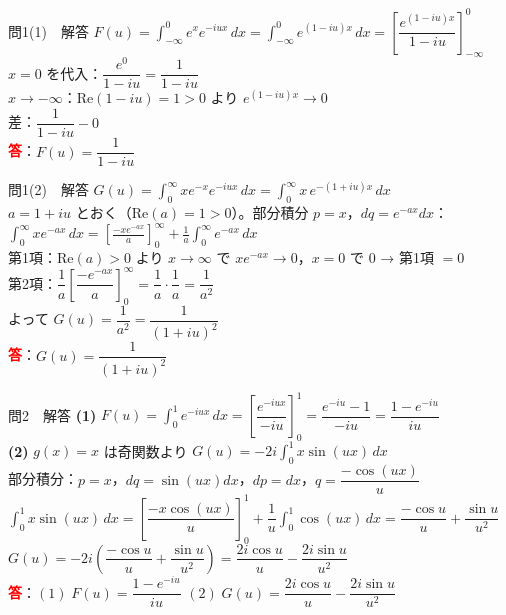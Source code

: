 \documentclass[professionalfonts]{beamer}
\begin{document}
\begin{frame}{問1(1)　解答}
  $F(u) = \displaystyle\int_{-\infty}^{0}e^{x}e^{-iux}\,dx
    = \int_{-\infty}^{0}e^{(1-iu)x}\,dx
    = \!\left[\dfrac{e^{(1-iu)x}}{1-iu}\right]_{-\infty}^{0}$\\[8pt]
  $x=0$ を代入：$\dfrac{e^{0}}{1-iu} = \dfrac{1}{1-iu}$\\[6pt]
  $x\to-\infty$：$\mathrm{Re}(1-iu)=1>0$ より $e^{(1-iu)x}\to 0$\\[6pt]
  差：$\dfrac{1}{1-iu} - 0$
  \\[12pt]\textcolor{red}{\textbf{答}}：$F(u) = \dfrac{1}{1-iu}$
\end{frame}

\begin{frame}{問1(2)　解答}
  $G(u) = \displaystyle\int_{0}^{\infty}xe^{-x}e^{-iux}\,dx
    = \int_{0}^{\infty}x\,e^{-(1+iu)x}\,dx$\\[4pt]
  $a=1+iu$ とおく（$\mathrm{Re}(a)=1>0$）。部分積分 $p=x$，$dq=e^{-ax}dx$：\\[4pt]
  $\displaystyle\int_{0}^{\infty}xe^{-ax}\,dx
    = \!\left[\frac{-xe^{-ax}}{a}\right]_{0}^{\infty}+\frac{1}{a}\int_{0}^{\infty}e^{-ax}\,dx$\\[4pt]
  第1項：$\mathrm{Re}(a)>0$ より $x\to\infty$ で $xe^{-ax}\to 0$，$x=0$ で $0$ → 第1項 $=0$\\[4pt]
  第2項：$\dfrac{1}{a}\!\left[\dfrac{-e^{-ax}}{a}\right]_{0}^{\infty}
    = \dfrac{1}{a}\cdot\dfrac{1}{a} = \dfrac{1}{a^{2}}$\\[6pt]
  よって $G(u) = \dfrac{1}{a^{2}} = \dfrac{1}{(1+iu)^{2}}$
  \\[8pt]\textcolor{red}{\textbf{答}}：$G(u) = \dfrac{1}{(1+iu)^{2}}$
\end{frame}

\begin{frame}{問2　解答}
  \textbf{(1)} $F(u) = \displaystyle\int_{0}^{1}e^{-iux}\,dx
    = \!\left[\dfrac{e^{-iux}}{-iu}\right]_{0}^{1}
    = \dfrac{e^{-iu}-1}{-iu} = \dfrac{1-e^{-iu}}{iu}$\\[8pt]
  \textbf{(2)} $g(x)=x$ は奇関数より $G(u) = -2i\displaystyle\int_{0}^{1}x\sin(ux)\,dx$\\[4pt]
  部分積分：$p=x$，$dq=\sin(ux)dx$，$dp=dx$，$q=\dfrac{-\cos(ux)}{u}$\\[4pt]
  $\displaystyle\int_{0}^{1}x\sin(ux)\,dx
    = \!\left[\dfrac{-x\cos(ux)}{u}\right]_{0}^{1}+\dfrac{1}{u}\int_{0}^{1}\cos(ux)\,dx
    = \dfrac{-\cos u}{u}+\dfrac{\sin u}{u^{2}}$\\[4pt]
  $G(u) = -2i\!\left(\dfrac{-\cos u}{u}+\dfrac{\sin u}{u^{2}}\right)
    = \dfrac{2i\cos u}{u}-\dfrac{2i\sin u}{u^{2}}$
  \\[8pt]\textcolor{red}{\textbf{答}}：$(1)\; F(u) = \dfrac{1-e^{-iu}}{iu}$ \hspace{2em}
  $(2)\; G(u) = \dfrac{2i\cos u}{u}-\dfrac{2i\sin u}{u^{2}}$
\end{frame}
\end{document}
